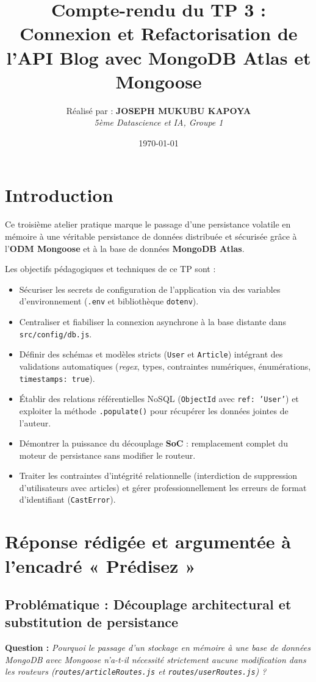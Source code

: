 \documentclass[12pt, a4paper]{article}
\title{\textbf{Compte-rendu du TP 3 : Connexion et Refactorisation de l'API Blog avec MongoDB Atlas et Mongoose}}
\author{
    Réalisé par : \textbf{JOSEPH MUKUBU KAPOYA} \\
    \textit{5ème Datascience et IA, Groupe 1}
}
\date{\today}
\begin{document}
\maketitle

\section*{Introduction}
Ce troisième atelier pratique marque le passage d'une persistance volatile en mémoire à une véritable persistance de données distribuée et sécurisée grâce à l'\textbf{ODM Mongoose} et à la base de données \textbf{MongoDB Atlas}. 

Les objectifs pédagogiques et techniques de ce TP sont :
\begin{itemize}
    \item Sécuriser les secrets de configuration de l'application via des variables d'environnement (\texttt{.env} et bibliothèque \texttt{dotenv}).
    \item Centraliser et fiabiliser la connexion asynchrone à la base distante dans \texttt{src/config/db.js}.
    \item Définir des schémas et modèles stricts (\texttt{User} et \texttt{Article}) intégrant des validations automatiques (\textit{regex}, types, contraintes numériques, énumérations, \texttt{timestamps: true}).
    \item Établir des relations référentielles NoSQL (\texttt{ObjectId} avec \texttt{ref: 'User'}) et exploiter la méthode \texttt{.populate()} pour récupérer les données jointes de l'auteur.
    \item Démontrer la puissance du découplage \textbf{SoC} : remplacement complet du moteur de persistance sans modifier le routeur.
    \item Traiter les contraintes d'intégrité relationnelle (interdiction de suppression d'utilisateurs avec articles) et gérer professionnellement les erreurs de format d'identifiant (\texttt{CastError}).
\end{itemize}

\section{Réponse rédigée et argumentée à l'encadré « Prédisez »}

\subsection*{Problématique : Découplage architectural et substitution de persistance}
\textbf{Question :} \textit{Pourquoi le passage d'un stockage en mémoire à une base de données MongoDB avec Mongoose n'a-t-il nécessité strictement aucune modification dans les routeurs (\texttt{routes/articleRoutes.js} et \texttt{routes/userRoutes.js}) ?}
\end{document}
